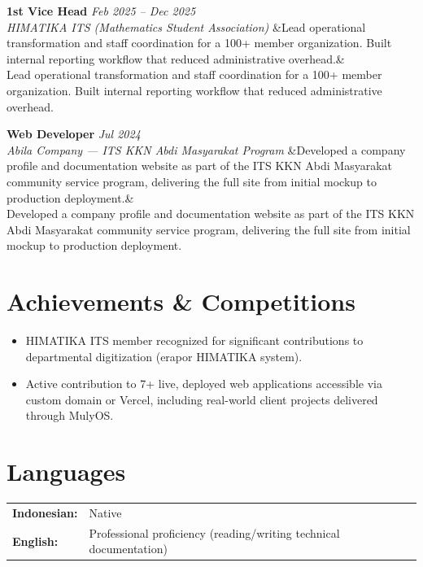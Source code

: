 \documentclass[a4paper,11pt]{article}
\newcommand{\cventry}[4]{%
  \noindent\textbf{#1} \hfill \textit{#3} \\
  \textit{#2}
  \ifx&#4& \else \\ \small #4 \fi
  \vspace{6pt}
}
\begin{document}
\cventry
  {1st Vice Head}
  {HIMATIKA ITS (Mathematics Student Association)}
  {Feb 2025 -- Dec 2025}
  {Lead operational transformation and staff coordination for a 100+ member organization. Built internal reporting workflow that reduced administrative overhead.}

\cventry
  {Web Developer}
  {Abila Company --- ITS KKN Abdi Masyarakat Program}
  {Jul 2024}
  {Developed a company profile and documentation website as part of the ITS KKN Abdi Masyarakat community service program, delivering the full site from initial mockup to production deployment.}

\section{Achievements \& Competitions}
\begin{itemize}[leftmargin=15pt, nosep]
  \item HIMATIKA ITS member recognized for significant contributions to departmental digitization (erapor HIMATIKA system).
  \item Active contribution to 7+ live, deployed web applications accessible via custom domain or Vercel, including real-world client projects delivered through MulyOS.
\end{itemize}

\section{Languages}
\begin{tabularx}{\textwidth}{@{}l l@{}}
\textbf{Indonesian:} & Native \\
\textbf{English:} & Professional proficiency (reading/writing technical documentation) \\
\end{tabularx}
\end{document}
